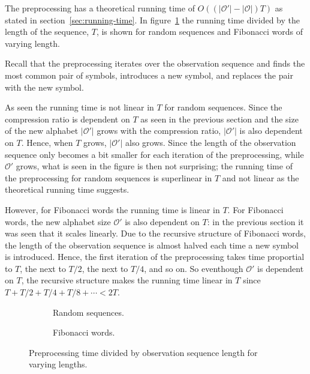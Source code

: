 The preprocessing has a theoretical running time of
$O(( \lvert\mathcal{O'}\rvert - \lvert{\mathcal{O}}\rvert) T)$ as stated in
section~\ref{sec:running-time}. In figure~\ref{fig:pre_viterbi_T} the running
time divided by the length of the sequence, $T$, is shown for random sequences
and Fibonacci words of varying length.

Recall that the preprocessing iterates over the observation sequence and finds
the most common pair of symbols, introduces a new symbol, and replaces the pair
with the new symbol.

As seen the running time is not linear in $T$ for random sequences. Since the
compression ratio is dependent on $T$ as seen in the previous section and the
size of the new alphabet $\lvert\mathcal{O'}\rvert$ grows with the compression
ratio, $\lvert\mathcal{O'}\rvert$ is also dependent on $T$. Hence, when $T$
grows, $\lvert\mathcal{O'}\rvert$ also grows. Since the length of the
observation sequence only becomes a bit smaller for each iteration of the
preprocessing, while $\mathcal{O'}$ grows, what is seen in the figure is then
not surprising; the running time of the preprocessing for random sequences is
superlinear in $T$ and not linear as the theoretical running time suggests.

However, for Fibonacci words the running time is linear in $T$. For Fibonacci
words, the new alphabet size $\mathcal{O'}$ is also dependent on $T$: in the
previous section it was seen that it scales linearly. Due to the recursive
structure of Fibonacci words, the length of the observation sequence is almost
halved each time a new symbol is introduced. Hence, the first iteration of the
preprocessing takes time proportial to $T$, the next to $T/2$, the next to
$T/4$, and so on. So eventhough $\mathcal{O'}$ is dependent on $T$, the
recursive structure makes the running time linear in $T$ since
$T + T/2 + T/4 + T/8 + \cdots < 2T$.

\begin{figure}
  \centering
  \begin{subfigure}[b]{0.5\textwidth}
    \centering 
    \caption{Random sequences.}
  \end{subfigure}%
  \begin{subfigure}[b]{0.5\textwidth}
    \centering 
    \caption{Fibonacci words.}
  \end{subfigure}
  \caption{Preprocessing time divided by observation sequence length for
    varying lengths.}
  \label{fig:pre_viterbi_T}
\end{figure}

